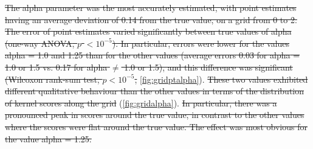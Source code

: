 {\color{red}\sout{The \gls{alpha} parameter was the most accurately estimated,
with point estimates having an average deviation of 
    0.14
from the true value, on a grid from 0 to 2. The error of point estimates varied
significantly between true values of \gls{alpha}
    (one-way \gls{ANOVA}, $p$ ${<}10^{-5}$). In
particular, errors were lower for the values \gls{alpha} = 1.0 and 1.25 than
for the other values
    (average errors 
    0.03
    for \gls{alpha} = 1.0 or 1.5 vs.
    0.17
    for \gls{alpha} $\neq$ 1.0 or 1.5),
and this difference was significant
    (Wilcoxon rank-sum test, $p {<}10^{-5}$,
}\cref{fig:gridptalpha}).
\sout{These two values exhibited different qualitative behaviour than the other
values in terms of the distribution of kernel scores along the grid
}(\cref{fig:gridalpha}). \sout{In particular, there was a pronounced peak in scores
around the true value, in contrast to the other values where the scores were
flat around the true value. The effect was most obvious for the value
\gls{alpha} = 1.25.}}


